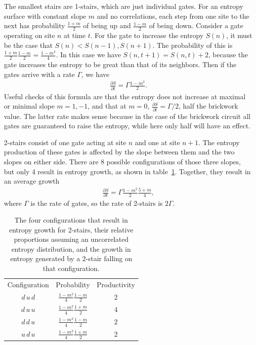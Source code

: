 \documentclass[11pt]{article}
\newcommand{\pd}[2]{\frac{\partial #1}{\partial #2}}
\begin{document}
The smallest stairs are 1-stairs, which are just individual gates. For an entropy surface with constant slope $m$ and no correlations, each step from one site to the next has probability $\frac{1+m}{2}$ of being up and $\frac{1-m}{2}$ of being down. Consider a gate operating on site $n$ at time $t$. For the gate to increase the entropy $S(n)$, it must be the case that $S(n)<S(n-1), S(n+1)$. The probability of this is $\frac{1+m}{2} \frac{1-m}{2} = \frac{1-m^2}{4}$. In this case we have $S(n,t+1)=S(n,t)+2$, because the gate increases the entropy to be great than that of its neighbors. Then if the gates arrive with a rate $\Gamma$, we have
\begin{align}
\pd{S}{t} = \Gamma\frac{1-m^2}{2}.
\end{align}
Useful checks of this formula are that the entropy does not increase at maximal or minimal slope $m=1,-1$, and that at $m=0$, $\pd{S}{t}=\Gamma/2$, half the brickwork value. The latter rate makes sense because in the case of the brickwork circuit all gates are guaranteed to raise the entropy, while here only half will have an effect.

2-stairs consist of one gate acting at site $n$ and one at site $n+1$. The entropy production of these gates is affected by the slope between them and the two slopes on either side. There are 8 possible configurations of those three slopes, but only 4 result in entropy growth, as shown in table~\ref{tab:2stair}. Together, they result in an average growth
\begin{align}
\pd{S}{t} = \Gamma\frac{1-m^2}{2}\frac{5+m}{4},
\end{align}
where $\Gamma$ is the rate of gates, so the rate of 2-stairs is $2\Gamma$.

\begin{table}
	\centering
	\begin{tabular}{ccc}
		Configuration & Probability                    & Productivity\\
		$d\,u\,d$     & $\frac{1-m^2}{4}\frac{1-m}{2}$ & 2\\
		$d\,u\,u$     & $\frac{1-m^2}{4}\frac{1+m}{2}$ & 4\\
		$d\,d\,u$     & $\frac{1-m^2}{4}\frac{1-m}{2}$ & 2\\
		$u\,d\,u$     & $\frac{1-m^2}{4}\frac{1+m}{2}$ & 2
	\end{tabular}
	\caption{The four configurations that result in entropy growth for 2-stairs, their relative proportions assuming an uncorrelated entropy distribution, and the growth in entropy generated by a 2-stair falling on that configuration.}
	\label{tab:2stair}
\end{table}
\end{document}
